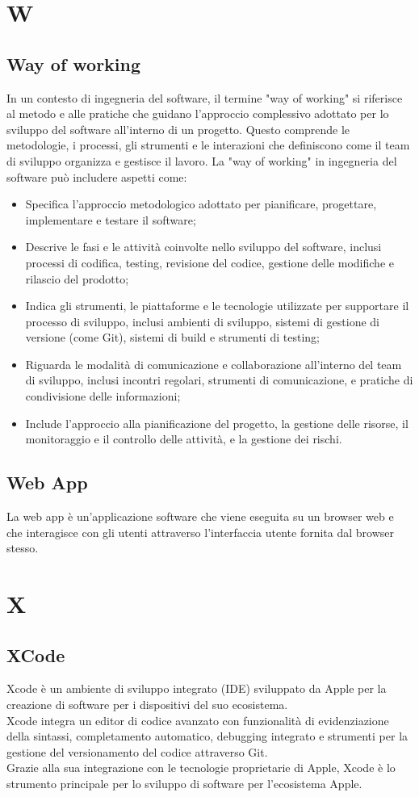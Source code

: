 \documentclass{article}
\begin{document}
\section{W}
\subsection{Way of working}
In un contesto di ingegneria del software, il termine "way of working" si riferisce al metodo e alle pratiche che guidano l'approccio complessivo adottato per lo sviluppo del software all'interno di un progetto. Questo comprende le metodologie, i processi, gli strumenti e le interazioni che definiscono come il team di sviluppo organizza e gestisce il lavoro. La "way of working" in ingegneria del software può includere aspetti come:
\begin{itemize}
    \item Specifica l'approccio metodologico adottato per pianificare, progettare, implementare e testare il software;
    \item Descrive le fasi e le attività coinvolte nello sviluppo del software, inclusi processi di codifica, testing, revisione del codice, gestione delle modifiche e rilascio del prodotto;
    \item Indica gli strumenti, le piattaforme e le tecnologie utilizzate per supportare il processo di sviluppo, inclusi ambienti di sviluppo, sistemi di gestione di versione (come Git), sistemi di build e strumenti di testing;
    \item Riguarda le modalità di comunicazione e collaborazione all'interno del team di sviluppo, inclusi incontri regolari, strumenti di comunicazione, e pratiche di condivisione delle informazioni;
    \item Include l'approccio alla pianificazione del progetto, la gestione delle risorse, il monitoraggio e il controllo delle attività, e la gestione dei rischi.
\end{itemize}

\subsection{Web App}
 La web app è un'applicazione software che viene eseguita su un browser web e che interagisce con gli utenti attraverso l'interfaccia utente fornita dal browser stesso.

\section{X}
 \subsection{XCode}
 Xcode è un ambiente di sviluppo integrato (IDE) sviluppato da Apple per la creazione di software per i dispositivi del suo ecosistema.\\
 Xcode integra un editor di codice avanzato con funzionalità di evidenziazione della sintassi, completamento automatico, debugging integrato e strumenti per la gestione del versionamento del codice attraverso Git.\\
 Grazie alla sua integrazione con le tecnologie proprietarie di Apple, Xcode è lo strumento principale per lo sviluppo di software per l'ecosistema Apple.
 
\end{document}
